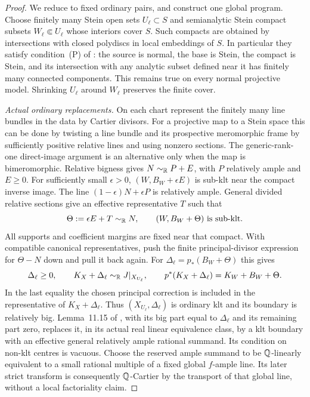 \begin{proof}
We reduce to fixed ordinary pairs, and construct one global program.
Choose finitely many Stein open sets \(U_\ell\subset S\) and
semianalytic Stein compact subsets \(W_\ell\Subset U_\ell\) whose
interiors cover \(S\). Such compacts are obtained by intersections
with closed polydiscs in local embeddings of \(S\). In particular
they satisfy condition~(P) of \cite{FujinoAnalyticBCHM}: the source
is normal, the base is Stein, the compact is Stein, and its
intersection with any analytic subset defined near it has finitely
many connected components. This remains true on every normal
projective model. Shrinking \(U_\ell\) around \(W_\ell\) preserves
the finite cover.

\smallskip\noindent
\emph{Actual ordinary replacements.}
On each chart represent the finitely many line bundles in the data
by Cartier divisors. For a projective map to a Stein space this can
be done by twisting a line bundle and its prospective meromorphic
frame by sufficiently positive relative lines and using nonzero
sections. The generic-rank-one direct-image argument is an
alternative only when the map is bimeromorphic.
Relative bigness gives
\(N\sim_{\mathbb R}P+E\), with \(P\) relatively ample and \(E\geq0\).
For sufficiently small \(\epsilon>0\),
\((W,B_W+\epsilon E)\) is sub-klt near the compact inverse image.
The line \((1-\epsilon)N+\epsilon P\) is relatively ample.
General divided relative sections give an effective representative
\(T\) such that
\[
 \Theta:=\epsilon E+T\sim_{\mathbb R}N,
 \qquad (W,B_W+\Theta)\text{ is sub-klt}.
\]
All supports and coefficient margins are fixed near that compact.
With compatible canonical representatives, push the finite
principal-divisor expression for \(\Theta-N\) down and pull it
back again. For \(\Delta_\ell=p_*(B_W+\Theta)\) this gives
\[
 \Delta_\ell\geq0,
 \qquad K_X+\Delta_\ell\sim_{\mathbb R}J|_{X_{U_\ell}},
 \qquad
 p^*(K_X+\Delta_\ell)=K_W+B_W+\Theta.
\]
In the last equality the chosen principal correction is included
in the representative of \(K_X+\Delta_\ell\).
Thus \((X_{U_\ell},\Delta_\ell)\) is ordinary klt and its boundary
is relatively big. Lemma~11.15 of \cite{FujinoAnalyticBCHM}, with
its big part equal to \(\Delta_\ell\) and its remaining part zero,
replaces it, in its actual real linear equivalence class, by a klt
boundary with an effective general relatively ample rational
summand. Its condition on non-klt centres is vacuous.
Choose the reserved ample summand to be \(\mathbb Q\)-linearly equivalent
to a small rational multiple of a fixed global \(f\)-ample line.
Its later strict transform is consequently \(\mathbb Q\)-Cartier by the
transport of that global line, without a local factoriality claim.


\end{proof}
